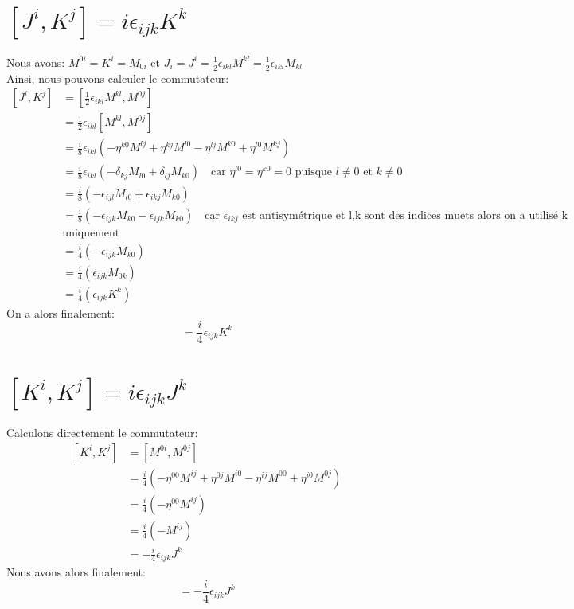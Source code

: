 \documentclass[12pt, a4paper]{article}
\begin{document}
 \section{\([J^{i},K^{j}]=i\epsilon_{ijk}K^{k}\)}
 Nous avons: \(M^{0i}=K^{i}=M_{0i}\) et \(J_{i}=J^{i}=\frac{1}{2}\epsilon_{ikl}M^{kl}=\frac{1}{2}
 \epsilon_{ikl}M_{kl}\) \\
 Ainsi, nous pouvons calculer le commutateur:
 \begin{equation}
 	\begin{split}
 		[J^{i},K^{j}]
 		&=[\frac{1}{2}\epsilon_{ikl}M^{kl}, M^{0j}]\\
 		&=\frac{1}{2}\epsilon_{ikl}[M^{kl},M^{0j}]\\
 		&=\frac{i}{8}\epsilon_{ikl}(-\eta^{k0}M^{lj}+\eta^{kj}M^{l0}-\eta^{lj}M^{k0}+\eta^{l0}M^{kj})\\
 		&=\frac{i}{8}\epsilon_{ikl}(-\delta_{kj}M_{l0}+\delta_{lj}M_{k0})
 		\quad \text{car \(\eta^{l0}=\eta^{k0}=0\) puisque \(l\neq0 \) et \(k\neq0 \)}\\
 		&=\frac{i}{8}(-\epsilon_{ijl}M_{l0}+\epsilon_{ikj}M_{k0})\\
 		&=\frac{i}{8}(-\epsilon_{ijk}M_{k0}-\epsilon_{ijk}M_{k0}) \quad \text{car \(\epsilon_{ikj}\) est antisymétrique et l,k sont des indices muets alors on a utilisé k} \\
 		&\text{uniquement }\\
 		&=\frac{i}{4}(-\epsilon_{ijk}M_{k0})\\
 		&=\frac{i}{4}(\epsilon_{ijk}M_{0k})\\
 		&=\frac{i}{4}(\epsilon_{ijk}K^{k})
 	\end{split}
 \end{equation}
 On a alors finalement: 
 \begin{equation}
  [J^{i},K^{j}]=\frac{i}{4}\epsilon_{ijk}K^{k}
 \end{equation}

 \section{\([K^{i},K^{j}]=i\epsilon_{ijk}J^{k}\)}
 Calculons directement le commutateur:
 \begin{equation}
 	\begin{split}
 		[K^{i},K^{j}]
 		&=[M^{0i},M^{0j}]\\
 		&=\frac{i}{4}(-\eta^{00}M^{ij}+\eta^{0j}M^{i0}-\eta^{ij}M^{00}+\eta^{i0}M^{0j})\\
 		&=\frac{i}{4} (-\eta^{00}M^{ij})\\
 		&= \frac{i}{4}(-M^{ij})\\
 		&= -\frac{i}{4}\epsilon_{ijk}J^{k}
 	\end{split}
 \end{equation}
 Nous avons alors finalement: 
 \begin{equation}
 	[K^{i},K^{j}]= -\frac{i}{4}\epsilon_{ijk}J^{k}
 \end{equation}
 
\end{document}

